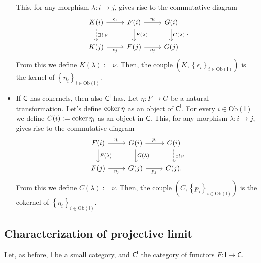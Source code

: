 \begin{prop}
\begin{itemize}
			This, for any morphism $\lambda: i \to j$, gives rise to the commutative diagram
			\begin{equation}
			\begin{tikzcd}
				K(i) \arrow[d, "\exists\, !\, \nu", dashrightarrow] \arrow[r, "\epsilon_i", rightarrow] &
				F(i) \arrow[r, "\eta_i", rightarrow] \arrow[d, "F(\lambda)", rightarrow] &
				G(i) \arrow[d, "G(\lambda)", rightarrow] \\
				K(j) \arrow[r, "\epsilon_j"', rightarrow] &
				F(j) \arrow[r, "\eta_j"', rightarrow] &
				G(j)
			\end{tikzcd}
			.\end{equation} 
			From this we define $K(\lambda) := \nu$.
			Then, the couple $\left(K, \left\{ \epsilon_i \right\}_{i \in \mathrm{Ob} \left(\mathsf{I}\right)} \right)$
			is the kernel of $\left\{ \eta_i \right\}_{i \in \mathrm{Ob} \left(\mathsf{I}\right)}$.

		\item If $\mathsf{C}$ has cokernels, 
			then also $\mathsf{C}^{\mathsf{I}}$ has.
			Let $\eta: F \to G$ be a natural transformation.
			Let's define $\operatorname{coker} \eta$ as an object of $\mathsf{C}^{\mathsf{I}}$.
			For every $i \in \mathrm{Ob} \left(\mathsf{I}\right)$
			we define $C(i) := \operatorname{coker} \eta_i$ as an object in $\mathsf{C}$.
			This, for any morphism $\lambda: i \to j$, gives rise to the commutative diagram
			\begin{equation}
			\begin{tikzcd}
				F(i) \arrow[r, "\eta_i", rightarrow] \arrow[d, "F(\lambda)", rightarrow] &
				G(i) \arrow[d, "G(\lambda)", rightarrow] 
				\arrow[r, "p_i", rightarrow] &
				C(i) \arrow[d, "\exists !\, \nu", dashrightarrow] \\
				F(j) \arrow[r, "\eta_j"', rightarrow] &
				G(j) \arrow[r, "p_j"', rightarrow] &
				C(j).
			\end{tikzcd}
			\end{equation} 
			From this we define $C(\lambda) := \nu$.
			Then, the couple
			$\left(C, \left\{ p_i \right\}_{i \in \mathrm{Ob} \left(\mathsf{I}\right)} \right)$
			is the cokernel of 
			$\left\{ \eta_i \right\}_{i \in \mathrm{Ob} \left(\mathsf{I}\right)}$.
	\end{itemize}
\end{prop} 

\subsection{Characterization of projective limit}
Let, as before, $\mathsf{I}$ be a small category, and $\mathsf{C}^{\mathsf{I}}$ the category of functors $F: \mathsf{I} \to \mathsf{C}$.

